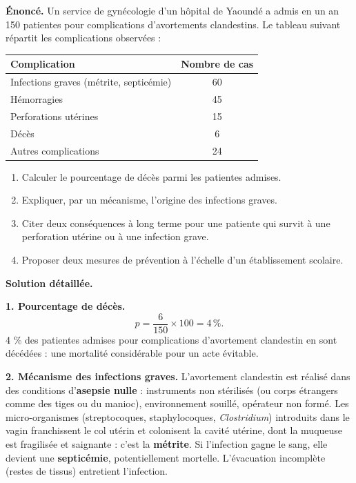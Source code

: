 \documentclass[11pt]{article}
\begin{document}
\begin{exoresolu}
\textbf{Énoncé.} Un service de gynécologie d'un hôpital de Yaoundé a admis en un an 150 patientes pour complications d'avortements clandestins. Le tableau suivant répartit les complications observées :

\begin{center}
\begin{tabularx}{\linewidth}{|X|c|}
\hline
\rowcolor{popblueL} \textbf{Complication} & \textbf{Nombre de cas} \\
\hline
Infections graves (métrite, septicémie) & 60 \\
\hline
Hémorragies & 45 \\
\hline
Perforations utérines & 15 \\
\hline
Décès & 6 \\
\hline
Autres complications & 24 \\
\hline
\end{tabularx}
\end{center}

\begin{enumerate}
\item Calculer le pourcentage de décès parmi les patientes admises.
\item Expliquer, par un mécanisme, l'origine des infections graves.
\item Citer deux conséquences à long terme pour une patiente qui survit à une perforation utérine ou à une infection grave.
\item Proposer deux mesures de prévention à l'échelle d'un établissement scolaire.
\end{enumerate}
\tcblower
\textbf{Solution détaillée.}

\textbf{1. Pourcentage de décès.}
\[ p = \frac{6}{150} \times 100 = 4\,\%. \]
4 \% des patientes admises pour complications d'avortement clandestin en sont décédées : une mortalité considérable pour un acte évitable.

\textbf{2. Mécanisme des infections graves.} L'avortement clandestin est réalisé dans des conditions d'\textbf{asepsie nulle} : instruments non stérilisés (ou corps étrangers comme des tiges ou du manioc), environnement souillé, opérateur non formé. Les micro-organismes (streptocoques, staphylocoques, \emph{Clostridium}) introduits dans le vagin franchissent le col utérin et colonisent la cavité utérine, dont la muqueuse est fragilisée et saignante : c'est la \textbf{métrite}. Si l'infection gagne le sang, elle devient une \textbf{septicémie}, potentiellement mortelle. L'évacuation incomplète (restes de tissus) entretient l'infection.


\end{exoresolu}
\end{document}

